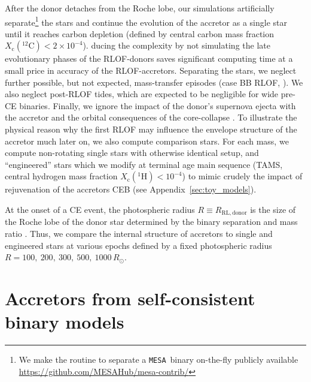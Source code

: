 \documentclass[twocolumn,twocolappendix,trackchanges]{aastex63}
\newcommand{\code}[1]{\texttt{#1}}
\newcommand{\mesa}{\code{MESA}}
\begin{document}
After the donor detaches from the Roche lobe, our simulations
artificially separate\footnote{We make the routine to separate a
  \mesa\ binary on-the-fly publicly available
  \url{https://github.com/MESAHub/mesa-contrib/}} the stars and
continue the evolution of the accretor as a single star until it
reaches carbon depletion (defined by central carbon mass fraction
$X_\mathrm{c}(^{12}\mathrm{C})<2\times10^{-4} $). ducing
  the complexity by not simulating the late evolutionary phases of the
  RLOF-donors saves significant computing time at a small price in
  accuracy of the RLOF-accretors. Separating the stars, we
  neglect further possible, but not expected, mass-transfer episodes
  (case BB RLOF, \citealt{delgado:81, laplace:2020}). We also neglect
  post-RLOF tides, which are expected to be
  negligible for wide pre-CE binaries. Finally, we ignore the impact of
  the donor's supernova ejecta with the accretor \cite[which has a small and
  short-lasting effect only on the outermost layers,
  e.g.,][Hirai~R., private communication]{hirai:2018, ogata:2021} and the orbital consequences of the
core-collapse \citep[e.g.,][]{brandt:1995, kalogera:1996,
    tauris:1998, renzo:2019walk}. To illustrate the physical reason
why the first RLOF may influence the envelope structure of the
accretor much later on, we also compute comparison stars. For each
mass, we compute non-rotating single stars with otherwise identical
setup, and ``engineered'' stars which we modify at terminal age main
sequence (TAMS, central hydrogen mass fraction
$X_\mathrm{c}(^1\mathrm{H})<10^{-4}$) to mimic crudely the impact of
rejuvenation of the accretors CEB (see Appendix~\ref{sec:toy_models}).

At the onset of a CE event, the photospheric radius
$R\equiv R_\mathrm{RL, donor}$ is the size of the Roche lobe of the
donor star determined by the binary separation and mass ratio
\citep[e.g.,][]{paczynski:1971, eggleton:83}. Thus, we compare the
internal structure of accretors to single and engineered stars at
various epochs defined by a fixed photospheric radius
$R=100,\ 200,\ 300,\ 500,\ 1000\,R_\odot$.

\section{Accretors from self-consistent binary models}
\label{sec:bin_models}
\end{document}

